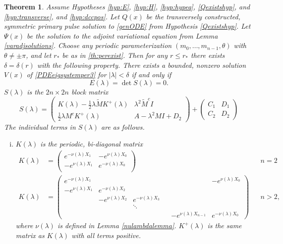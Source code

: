 \documentclass[10pt,reqno]{amsart}
\theoremstyle{plain}
\newtheorem{theorem}{Theorem}
\theoremstyle{definition}
\theoremstyle{remark}
\numberwithin{theorem}{section}
\numberwithin{equation}{section}
\begin{document}
\begin{theorem}\label{blockmatrixtheorem}
Assume Hypotheses \ref{hyp:E}, \ref{hyp:H}, \ref{hyp:hypeq}, \ref{Qexistshyp}, and \ref{hyp:transverse}, and \ref{hyp:dccpos}. Let $Q(x)$ be the transversely constructed, symmetric primary pulse solution to \eqref{genODE} from Hypothesis \ref{Qexistshyp}. Let $\Psi(x)$ be the solution to the adjoint variational equation from Lemma \ref{varadjsolutions}. Choose any periodic parameterization $(m_0, \dots, m_{n-1}, \theta)$ with $\theta \neq \pm \pi$, and let $r_*$ be as in \cref{th:perexist}. Then for any $r \leq r_*$ there exists $\delta = \delta(r)$ with the following property. There exists a bounded, nonzero solution $V(x)$ of \cref{PDEeigsystemper3} for $|\lambda| < \delta$ if and only if
\begin{equation}\label{blockmatrixcond}
E(\lambda) = \det S(\lambda) = 0.
\end{equation}
$S(\lambda)$ is the $2n \times 2n$ block matrix
\begin{equation}\label{blockeq}
S(\lambda) = 
\begin{pmatrix}
K(\lambda) - \frac{1}{2} \lambda \tilde{M} K^+(\lambda) & \lambda^2 \tilde{M}^c I \\
\frac{1}{2} \lambda M^c K^+(\lambda) & A - \lambda^2 MI + D_2
\end{pmatrix} +
\begin{pmatrix}C_1 & D_1 \\ C_2 & D_2
\end{pmatrix}
\end{equation}
The individual terms in $S(\lambda)$ are as follows.

\begin{enumerate}[(i)]
\item $K(\lambda)$ is the periodic, bi-diagonal matrix
\begin{align*}
K(\lambda) &=  
\begin{pmatrix}
e^{-\nu(\lambda)X_1} & -e^{\nu(\lambda)X_0} \\
-e^{\nu(\lambda)X_1} & e^{-\nu(\lambda)X_0} \\
\end{pmatrix} && n = 2\\
K(\lambda) &=  
\begin{pmatrix}
e^{-\nu(\lambda)X_1} & & & & & -e^{\nu(\lambda)X_0} \\
-e^{\nu(\lambda)X_1} & e^{-\nu(\lambda)X_2} \\
& -e^{\nu(\lambda)X_2} & e^{-\nu(\lambda)X_3} \\
  & & \ddots & && \\
& & & & -e^{\nu(\lambda)X_{n-1}} & e^{-\nu(\lambda)X_0}
\end{pmatrix} && n > 2,
\end{align*}
where $\nu(\lambda)$ is defined in Lemma \ref{nulambdalemma}. $K^+(\lambda)$ is the same matrix as $K(\lambda)$ with all terms positive.


\end{enumerate}
\end{theorem}
\end{document}
